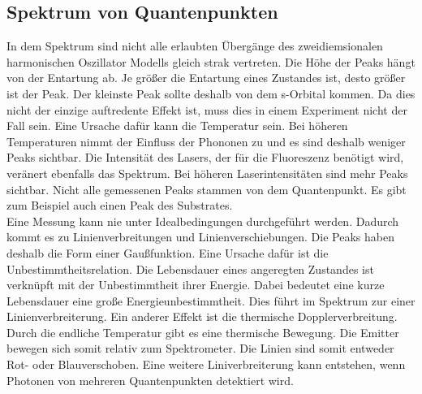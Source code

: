 \subsection{Spektrum von Quantenpunkten}
In dem Spektrum sind nicht alle erlaubten Übergänge des zweidiemsionalen harmonischen Oszillator Modells gleich strak vertreten. Die Höhe der Peaks hängt von der Entartung ab. Je größer die Entartung eines Zustandes ist, desto größer ist der Peak. Der kleinste Peak sollte deshalb von dem s-Orbital kommen. Da dies nicht der einzige auftredente Effekt ist, muss dies in einem Experiment nicht der Fall sein. Eine Ursache dafür kann die Temperatur sein. Bei höheren Temperaturen nimmt der Einfluss der Phononen zu und es sind deshalb weniger Peaks sichtbar. Die Intensität des Lasers, der für die Fluoreszenz benötigt wird, veränert ebenfalls das Spektrum. Bei höheren Laserintensitäten sind mehr Peaks sichtbar. Nicht alle gemessenen Peaks stammen von dem Quantenpunkt. Es gibt zum Beispiel auch einen Peak des Substrates. \\
Eine Messung kann nie unter Idealbedingungen durchgeführt werden. Dadurch kommt es zu Linienverbreitungen und Linienverschiebungen. Die Peaks haben deshalb die Form einer Gaußfunktion. Eine Ursache dafür ist die Unbestimmtheitsrelation. Die Lebensdauer eines angeregten Zustandes ist verknüpft mit der Unbestimmtheit ihrer Energie.  Dabei bedeutet eine kurze Lebensdauer eine große Energieunbestimmtheit. Dies führt im Spektrum zur einer Linienverbreiterung. Ein anderer Effekt ist die thermische Dopplerverbreitung. Durch die endliche Temperatur gibt es eine thermische Bewegung. Die Emitter bewegen sich somit relativ zum Spektrometer. Die Linien sind somit entweder Rot- oder Blauverschoben. Eine weitere Liniverbreiterung kann entstehen, wenn Photonen von mehreren Quantenpunkten detektiert wird. 
